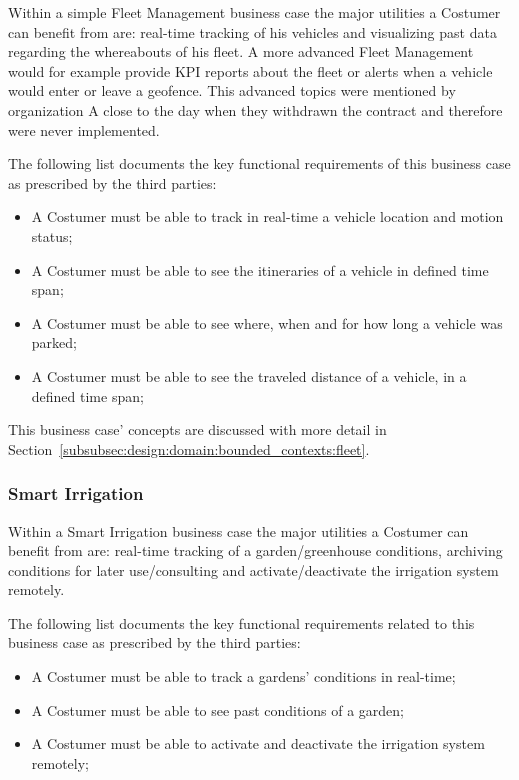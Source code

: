 Within a simple Fleet Management business case the major utilities a Costumer can benefit from are: real-time tracking of his vehicles and visualizing past data regarding the whereabouts of his fleet. A more advanced Fleet Management would for example provide \gls{KPI} reports about the fleet or alerts when a vehicle would enter or leave a geofence. This advanced topics were mentioned by organization A close to the day when they withdrawn the contract and therefore were never implemented.

The following list documents the key functional requirements of this business case as prescribed by the third parties:

\begin{itemize}
    \item A Costumer must be able to track in real-time a vehicle location and motion status;
    \item A Costumer must be able to see the itineraries of a vehicle in defined time span;
    \item A Costumer must be able to see where, when and for how long a vehicle was parked;
    \item A Costumer must be able to see the traveled distance of a vehicle, in a defined time span;
\end{itemize}

This business case' concepts are discussed with more detail in Section~\ref{subsubsec:design:domain:bounded_contexts:fleet}.

\subsubsection*{Smart Irrigation}
\label{subsubsec:requirements:functional:costumer:irrigation}

Within a Smart Irrigation business case the major utilities a Costumer can benefit from are: real-time tracking of a garden/greenhouse conditions, archiving conditions for later use/consulting and activate/deactivate the irrigation system remotely.

The following list documents the key functional requirements related to this business case as prescribed by the third parties:

\begin{itemize}
    \item A Costumer must be able to track a gardens' conditions in real-time;
    \item A Costumer must be able to see past conditions of a garden;
    \item A Costumer must be able to activate and deactivate the irrigation system remotely;
\end{itemize}

